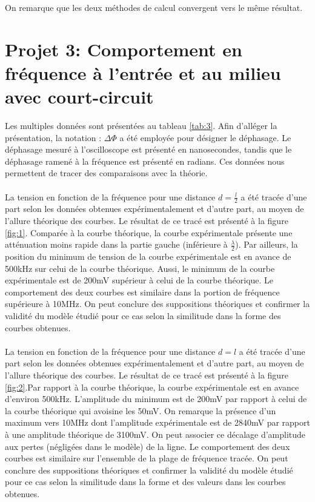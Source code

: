 On remarque que les deux méthodes de calcul convergent vers le même résultat.

\section{Projet 3: Comportement en fréquence à l'entrée et au milieu avec court-circuit}
Les multiples données sont présentées au tableau \ref{tab:3}. Afin d'alléger la présentation, la notation : $\Delta \Phi$ a été employée pour désigner le déphasage. Le déphasage mesuré à l'oscilloscope est présenté en nanosecondes, tandis que le déphasage ramené à la fréquence est présenté en radians. Ces données nous permettent de tracer des comparaisons avec la théorie. 

\paragraph{} La tension en fonction de la fréquence pour une distance $d = \frac{l}{2}$ a été tracée d'une part selon les données obtenues expérimentalement et d'autre part, au moyen de l'allure théorique des courbes. Le résultat de ce tracé est présenté à la figure \ref{fig:1}. Comparée à la courbe théorique, la courbe expérimentale présente une atténuation moins rapide dans la partie gauche (inférieure à $\frac{\lambda}{2}$). Par ailleurs, la position du minimum de tension de la courbe expérimentale est en avance de 500kHz sur celui de la courbe théorique. Aussi, le minimum de la courbe expérimentale est de 200mV supérieur à celui de la courbe théorique. Le comportement des deux courbes est similaire dans la portion de fréquence supérieure à 10MHz. On peut conclure des suppositions théoriques et confirmer la validité du modèle étudié pour ce cas selon la similitude dans la forme des courbes obtenues.

\paragraph{}La tension en fonction de la fréquence pour une distance $d = l$ a été tracée d'une part selon les données obtenues expérimentalement et d'autre part, au moyen de l'allure théorique des courbes. Le résultat de ce tracé est présenté à la figure \ref{fig:2}.Par rapport à la courbe théorique, la courbe expérimentale est en avance d'environ 500kHz. L'amplitude du minimum est de 200mV par rapport à  celui de la courbe théorique qui avoisine les 50mV. On remarque la présence d'un maximum vers 10MHz dont l'amplitude expérimentale est de 2840mV par rapport à une amplitude théorique de 3100mV. On peut associer ce décalage d'amplitude aux pertes (négligées dans le modèle) de la ligne. Le comportement des deux courbes est similaire sur l'ensemble de la plage de fréquence tracée. On peut conclure des suppositions théoriques et confirmer la validité du modèle étudié pour ce cas selon la similitude dans la forme et des valeurs dans les courbes obtenues.

